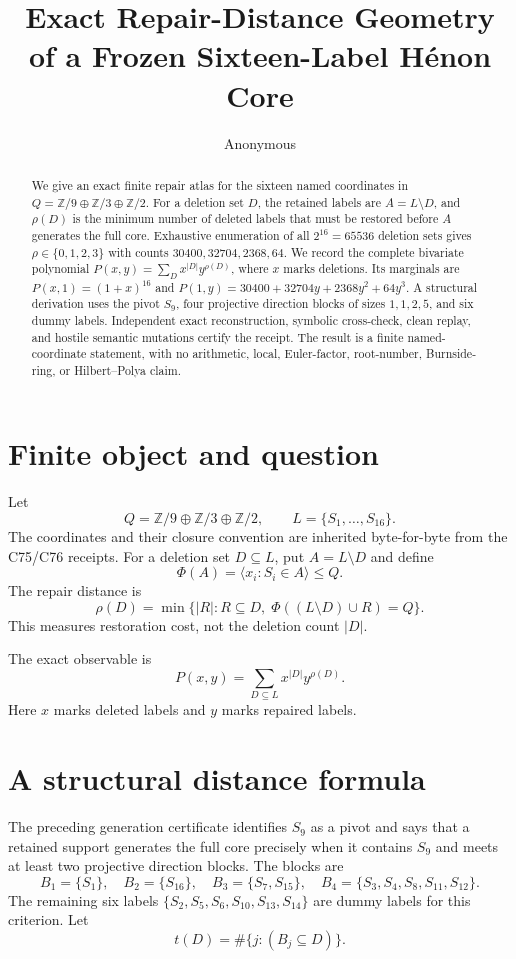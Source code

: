 \documentclass[10pt]{article}
\title{Exact Repair-Distance Geometry of a Frozen
Sixteen-Label H\'enon Core}
\author{Anonymous}
\date{}
\newcommand{\Z}{\mathbb Z}
\newcommand{\Qcore}{Q}
\newcommand{\Phiop}{\Phi}
\begin{document}
\maketitle

\begin{abstract}
We give an exact finite repair atlas for the sixteen named coordinates in
$Q=\Z/9\oplus\Z/3\oplus\Z/2$.  For a deletion set $D$, the retained labels are
$A=L\setminus D$, and $\rho(D)$ is the minimum number of deleted labels that
must be restored before $A$ generates the full core.  Exhaustive enumeration
of all $2^{16}=65536$ deletion sets gives
$\rho\in\{0,1,2,3\}$ with counts
$30400,32704,2368,64$.  We record the complete bivariate polynomial
$P(x,y)=\sum_D x^{|D|}y^{\rho(D)}$, where $x$ marks deletions.  Its marginals
are $P(x,1)=(1+x)^{16}$ and
$P(1,y)=30400+32704y+2368y^2+64y^3$.  A structural derivation uses the
pivot $S_9$, four projective direction blocks of sizes $1,1,2,5$, and six
dummy labels.  Independent exact reconstruction, symbolic cross-check,
clean replay, and hostile semantic mutations certify the receipt.  The result
is a finite named-coordinate statement, with no arithmetic, local,
Euler-factor, root-number, Burnside-ring, or Hilbert--Polya claim.
\end{abstract}

\section{Finite object and question}
Let
\[
 \Qcore=\Z/9\oplus\Z/3\oplus\Z/2,
 \qquad L=\{S_1,\ldots,S_{16}\}.
\]
The coordinates and their closure convention are inherited byte-for-byte from
the C75/C76 receipts.  For a deletion set $D\subseteq L$, put
$A=L\setminus D$ and define
\[
 \Phiop(A)=\langle x_i:S_i\in A\rangle\leq \Qcore.
\]
The repair distance is
\begin{equation}
 \rho(D)=\min\bigl\{|R|:R\subseteq D,\;
       \Phiop((L\setminus D)\cup R)=\Qcore\bigr\}.
 \label{eq:rho}
\end{equation}
This measures restoration cost, not the deletion count $|D|$.

The exact observable is
\begin{equation}
 P(x,y)=\sum_{D\subseteq L}x^{|D|}y^{\rho(D)}.
 \label{eq:poly}
\end{equation}
Here $x$ marks deleted labels and $y$ marks repaired labels.

\section{A structural distance formula}
The preceding generation certificate identifies $S_9$ as a pivot and says that
a retained support generates the full core precisely when it contains $S_9$
and meets at least two projective direction blocks.  The blocks are
\[
 B_1=\{S_1\},\quad B_2=\{S_{16}\},\quad
 B_3=\{S_7,S_{15}\},\quad
 B_4=\{S_3,S_4,S_8,S_{11},S_{12}\}.
\]
The remaining six labels
$\{S_2,S_5,S_6,S_{10},S_{13},S_{14}\}$ are dummy labels for this criterion.
Let
\[
 t(D)=\#\{j:(B_j\subseteq D)\}.
\]
\end{document}
